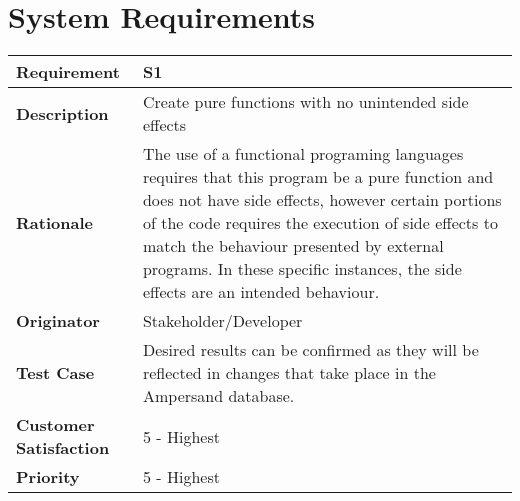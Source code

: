 \section{System Requirements}
{\setlength{\tabcolsep}{6pt} %
    \begin{tabularx}{\textwidth}{>{\bfseries}m{3cm}X}
        Requirement & S1 \\ 
        \midrule
        \endhead
        Description  & Create pure functions with no unintended side effects
        \\	Rationale & The use of a functional programing languages requires 
        that this program be a pure function and does not have side effects, 
        however certain portions of the code requires the execution of side 
        effects to match the behaviour presented by external programs. In these 
        specific instances, the side effects are an intended behaviour.
        \\	Originator & Stakeholder/Developer
        
        \\ Test Case & Desired results can be confirmed as they will be 
        reflected in changes that take place in the Ampersand database.
        \\	Customer Satisfaction & 5 - Highest 
        \\	Priority & 5 - Highest 
        \vspace{12pt}
    \end{tabularx}
}


